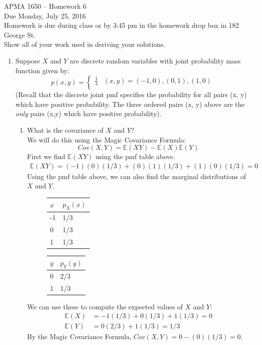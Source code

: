 \documentclass[12pt]{article}
\def\E{{\mathbb E}}
\begin{document}
\title{}
\author{\vspace{-10ex} }

\begin{center}
{\LARGE APMA 1650 -- Homework 6}\\
\vspace{5mm}
{\large Due Monday, July 25, 2016}\\
\vspace{5mm}
Homework is due during class or by 3:45 pm in the homework drop box in 182 George St.\\
Show all of your work used in deriving your solutions.
\end{center}

\begin{enumerate}

\item Suppose $X$ and $Y$ are discrete random variables with joint probability mass function given by:
\[
p(x, y) = \begin{cases}
\frac{1}{3} & (x, y) = (-1, 0), (0, 1), (1, 0) \\
\end{cases}
\]
(Recall that the discrete joint pmf specifies the probability for all pairs (x, y) which have positive probability. The three ordered pairs (x, y) above are the \emph{only} pairs (x,y) which have positive probability).
\begin{enumerate}
\item What is the covariance of $X$ and $Y$?\\

We will do this using the Magic Covariance Formula:
\[
Cov(X, Y) = \E(XY) - \E(X)\E(Y)
\]
First we find $\E(XY)$ using the pmf table above.
\begin{align*}
\E(XY) = (-1)(0)(1/3) + (0)(1)(1/3) + (1)(0)(1/3) = 0
\end{align*}
Using the pmf table above, we can also find the marginal distributions of $X$ and $Y$.
\begin{figure}[H]
\centering
\begin{tabular}{l@{\hskip 2cm}l}
\toprule
$x$ & $p_X(x)$\\
\midrule
-1 & 1/3\\
0 & 1/3\\
1 & 1/3\\
\bottomrule
\end{tabular}
\end{figure}

\begin{figure}[H]
\centering
\begin{tabular}{l@{\hskip 2cm}l}
\toprule
$y$ & $p_Y(y)$\\
\midrule
0 & 2/3\\
1 &1/3\\
\bottomrule
\end{tabular}
\end{figure}
We can use these to compute the expected values of $X$ and $Y$:
\begin{align*}
\E(X) &= -1 (1/3) + 0 (1/3) + 1 (1/3) = 0 \\
\E(Y) &=  0 (2/3) + 1 (1/3) = 1/3
\end{align*}
By the Magic Covariance Formula, $Cov(X, Y) = 0 - (0)(1/3) = 0$.


\end{enumerate}
\end{enumerate}
\end{document}
